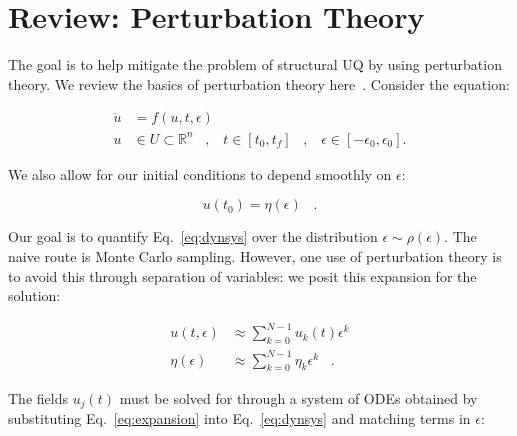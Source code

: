 \documentclass[11pt]{article}
\begin{document}
\newcommand*{\vertbar}{\rule[-1ex]{0.5pt}{2.5ex}}
\newcommand*{\horzbar}{\rule[.5ex]{2.5ex}{0.5pt}}
\maketitle

\vspace*{-0.75in}

\section{Review: Perturbation Theory}

The goal is to help mitigate the problem of structural UQ by using perturbation theory. 
We review the basics of perturbation theory here~\cite{khalil}.
Consider the equation:

\begin{equation}
        \label{eq:dynsys}
        \begin{aligned}
                \dot{u} &= f( u , t , \epsilon )  \\
                u &\in U \subset \mathbb{R}^n \;\;\; , \;\;\; t \in [t_0,t_f] \;\;\; , \;\;\; \epsilon \in [-\epsilon_0 , \epsilon_0].
        \end{aligned}
\end{equation}

\noindent We also allow for our initial conditions to depend smoothly on $\epsilon$:

\begin{equation}
        \label{eq:ics}
        u(t_0) = \eta(\epsilon) \;\;\; .
\end{equation}

\noindent Our goal is to quantify Eq.~\ref{eq:dynsys} over the distribution $\epsilon \sim \rho(\epsilon)$. 
The naive route is Monte Carlo sampling. 
However, one use of perturbation theory is to avoid this through separation of variables: we posit this expansion for the solution:

\begin{equation}
        \label{eq:expansion}
        \begin{aligned}
                u( t , \epsilon ) &\approx \sum_{k=0}^{N-1} u_k(t) \epsilon^k \\
                \eta( \epsilon ) &\approx \sum_{k=0}^{N-1} \eta_k \epsilon^k \;\;\; .
        \end{aligned}
\end{equation}

\noindent The fields $u_j(t)$ must be solved for through a system of ODEs obtained by substituting Eq.~\ref{eq:expansion} into Eq.~\ref{eq:dynsys} and matching terms in $\epsilon$:
\end{document}
